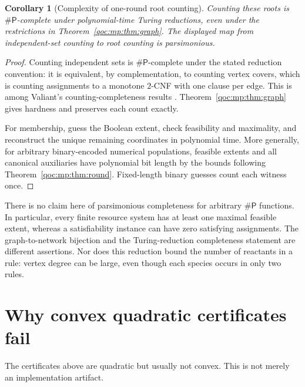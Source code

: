 \documentclass[11pt,letterpaper]{article}
\newtheorem{corollary}[theorem]{Corollary}
\theoremstyle{definition}
\theoremstyle{remark}
\newcommand{\PP}{\mathsf{\#P}}
\begin{document}
\begin{corollary}[Complexity of one-round root counting]\label{qoc:mp:cor:sharpP}
Counting these roots is $\PP$-complete under polynomial-time Turing
reductions, even under the restrictions in Theorem~\ref{qoc:mp:thm:graph}.
The displayed map from independent-set counting to root counting is
parsimonious.
\end{corollary}
\begin{proof}
Counting independent sets is $\PP$-complete under the stated reduction
convention: it is equivalent, by complementation, to counting vertex
covers, which is counting assignments to a monotone $2$-CNF with one
clause per edge. This is among Valiant's counting-completeness results
\cite{mp:valiant}. Theorem~\ref{qoc:mp:thm:graph} gives hardness and preserves each
count exactly.

For membership, guess the Boolean extent, check feasibility and
maximality, and reconstruct the unique remaining coordinates in polynomial
time. More generally, for arbitrary binary-encoded numerical populations,
feasible extents and all canonical auxiliaries have polynomial bit length
by the bounds following Theorem~\ref{qoc:mp:thm:round}. Fixed-length binary
guesses count each witness once.
\end{proof}

There is no claim here of parsimonious completeness for arbitrary
$\PP$ functions. In particular, every finite resource system has at least
one maximal feasible extent, whereas a satisfiability instance can have
zero satisfying assignments. The graph-to-network bijection and the
Turing-reduction completeness statement are different assertions. Nor does
this reduction bound the number of reactants in a rule: vertex degree
can be large, even though each species occurs in only two rules.

\section{Why convex quadratic certificates fail}\label{qoc:mp:sec:convex}
The certificates above are quadratic but usually not convex. This is not
merely an implementation artifact.
\end{document}
